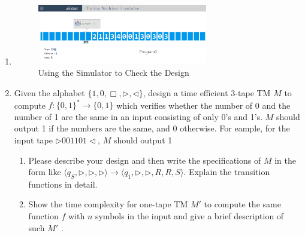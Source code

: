 \documentclass[12pt,a4paper]{article}
\makeatletter
\newtheorem*{solution}{Solution}
\theoremstyle{definition}
\renewenvironment{solution}[1][Solution] {\par\pushQED{\qed}\normalfont\topsep6\p@\@plus6\p@\relax\trivlist\item[\hskip\labelsep\bfseries#1\@addpunct{.}]\ignorespaces}{\popQED\endtrivlist\@endpefalse} \makeatother
\makeatother
\begin{document}
\begin{enumerate}
\begin{solution}
\begin{enumerate}
    \begin{figure}[!htbp]
    	\centering
    	\includegraphics[width=0.7\textwidth]{Fig-TM.png}
    	\caption{Using the Simulator to Check the Design}
    	\label{Fig-TM}
    \end{figure}
    \end{enumerate}
    \end{solution}
    \newpage
    \item 
    Given the alphabet $\{1, 0, \Box, \triangleright, \triangleleft\}$, design a time efficient 3-tape TM $M$ to compute $f:\{0,1\}^*\rightarrow\{0,1\}$ which verifies whether the number of 0 and the number of 1 are the same in an input consisting of only 0's and 1's. $M$ should output 1 if the numbers are the same, and 0 otherwise. For eample, for the input tape $\triangleright 001101\triangleleft$, $M$ should output 1
    
    \begin{enumerate}
	    \item
	    Please describe your design and then write the specifications of $M$ in the form like $\langle q_S, \triangleright, \triangleright, \triangleright \rangle \rightarrow \langle q_1, \triangleright,\triangleright,  R, R, S \rangle$. Explain the transition functions in detail.
	    
	    \item 
	    Show the time complexity for one-tape TM $M'$ to compute the same function $f$ with $n$ symbols in the input and give a brief description of such $M'$ .
	
	\end{enumerate}
	

\end{enumerate}
\end{document}

